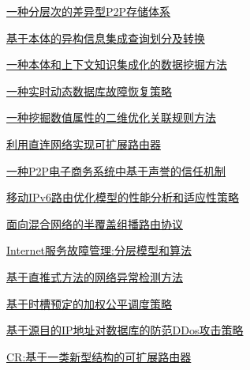 \documentclass[a4paper]{article}
\begin{document}
\href{http://www.jos.org.cn/ch/reader/download_pdf.aspx?file_no=20071011&year_id=2007&quarter_id=10&falg=1}{一种分层次的差异型P2P存储体系}

\href{http://www.jos.org.cn/ch/reader/download_pdf.aspx?file_no=20071012&year_id=2007&quarter_id=10&falg=1}{基于本体的异构信息集成查询划分及转换}

\href{http://www.jos.org.cn/ch/reader/download_pdf.aspx?file_no=20071013&year_id=2007&quarter_id=10&falg=1}{一种本体和上下文知识集成化的数据挖掘方法}

\href{http://www.jos.org.cn/ch/reader/download_pdf.aspx?file_no=20071014&year_id=2007&quarter_id=10&falg=1}{一种实时动态数据库故障恢复策略}

\href{http://www.jos.org.cn/ch/reader/download_pdf.aspx?file_no=20071015&year_id=2007&quarter_id=10&falg=1}{一种挖掘数值属性的二维优化关联规则方法}

\href{http://www.jos.org.cn/ch/reader/download_pdf.aspx?file_no=20071016&year_id=2007&quarter_id=10&falg=1}{利用直连网络实现可扩展路由器}

\href{http://www.jos.org.cn/ch/reader/download_pdf.aspx?file_no=20071017&year_id=2007&quarter_id=10&falg=1}{一种P2P电子商务系统中基于声誉的信任机制}

\href{http://www.jos.org.cn/ch/reader/download_pdf.aspx?file_no=20071018&year_id=2007&quarter_id=10&falg=1}{移动IPv6路由优化模型的性能分析和适应性策略}

\href{http://www.jos.org.cn/ch/reader/download_pdf.aspx?file_no=20071019&year_id=2007&quarter_id=10&falg=1}{面向混合网络的半覆盖组播路由协议}

\href{http://www.jos.org.cn/ch/reader/download_pdf.aspx?file_no=20071020&year_id=2007&quarter_id=10&falg=1}{Internet服务故障管理:分层模型和算法}

\href{http://www.jos.org.cn/ch/reader/download_pdf.aspx?file_no=20071021&year_id=2007&quarter_id=10&falg=1}{基于直推式方法的网络异常检测方法}

\href{http://www.jos.org.cn/ch/reader/download_pdf.aspx?file_no=20071022&year_id=2007&quarter_id=10&falg=1}{基于时槽预定的加权公平调度策略}

\href{http://www.jos.org.cn/ch/reader/download_pdf.aspx?file_no=20071023&year_id=2007&quarter_id=10&falg=1}{基于源目的IP地址对数据库的防范DDos攻击策略}

\href{http://www.jos.org.cn/ch/reader/download_pdf.aspx?file_no=20071024&year_id=2007&quarter_id=10&falg=1}{CR:基于一类新型结构的可扩展路由器}
\end{document}
